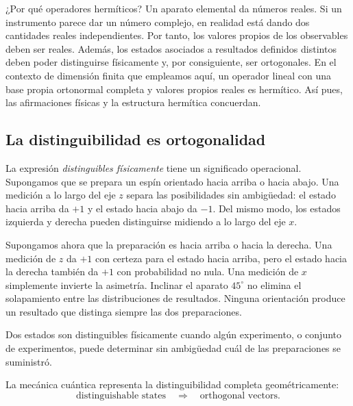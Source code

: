¿Por qué operadores hermíticos? Un aparato elemental da números reales. Si un instrumento parece dar un número complejo, en realidad está dando dos cantidades reales independientes. Por tanto, los valores propios de los observables deben ser reales. Además, los estados asociados a resultados definidos distintos deben poder distinguirse físicamente y, por consiguiente, ser ortogonales. En el contexto de dimensión finita que empleamos aquí, un operador lineal con una base propia ortonormal completa y valores propios reales es hermítico. Así pues, las afirmaciones físicas y la estructura hermítica concuerdan.

\subsection{La distinguibilidad es ortogonalidad}

La expresión \emph{distinguibles físicamente} tiene un significado operacional. Supongamos que se prepara un espín orientado hacia arriba o hacia abajo. Una medición a lo largo del eje \(z\) separa las posibilidades sin ambigüedad: el estado hacia arriba da \(+1\) y el estado hacia abajo da \(-1\). Del mismo modo, los estados izquierda y derecha pueden distinguirse midiendo a lo largo del eje \(x\).

Supongamos ahora que la preparación es hacia arriba o hacia la derecha. Una medición de \(z\) da \(+1\) con certeza para el estado hacia arriba, pero el estado hacia la derecha también da \(+1\) con probabilidad no nula. Una medición de \(x\) simplemente invierte la asimetría. Inclinar el aparato \(45^\circ\) no elimina el solapamiento entre las distribuciones de resultados. Ninguna orientación produce un resultado que distinga siempre las dos preparaciones.

\begin{definition}
Dos estados son distinguibles físicamente cuando algún experimento, o conjunto de experimentos, puede determinar sin ambigüedad cuál de las preparaciones se suministró.
\end{definition}

La mecánica cuántica representa la distinguibilidad completa geométricamente:
\begin{equation}
\text{distinguishable states}
\quad\Longrightarrow\quad
\text{orthogonal vectors}.
\end{equation}

\begin{classroomqa}
\end{classroomqa}


